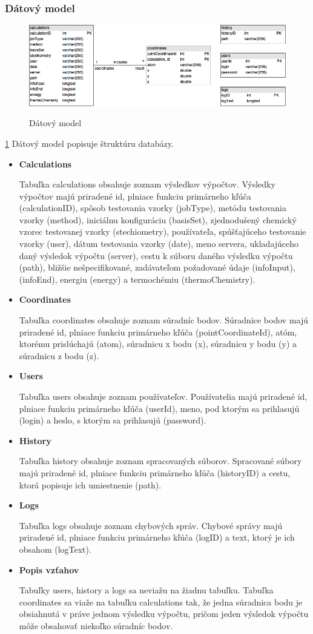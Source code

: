 \documentclass[12pt,a4paper]{article}
\begin{document}
\subsubsection{Dátový model}
\begin{figure}[H]
	\caption{Dátový model}
	\includegraphics[width=\textwidth]{datovy_model}
	\label{fig:datovy_model}
\end{figure}
\ref{fig:datovy_model}
Dátový model popisuje štruktúru databázy.
\begin{itemize}
	\item{\bf Calculations} \par
	Tabuľka calculations obsahuje zoznam výsledkov výpočtov. Výsledky výpočtov majú priradené id, plniace funkciu primárneho kľúča (calculationID), spôsob testovania vzorky (jobType), metódu testovania vzorky (method), iniciálnu konfiguráciu (basisSet), zjednodušený chemický vzorec testovanej vzorky (stechiometry), používateľa, spúšťajúceho testovanie vzorky (user), dátum testovania vzorky (date), meno servera, ukladajúceho daný výsledok výpočtu (server), cestu k súboru daného výsledku výpočtu (path), bližšie nešpecifikované, zadávateľom požadované údaje (infoInput), (infoEnd), energiu (energy) a termochémiu (thermoChemistry).
	\item{\bf Coordinates} \par
	Tabuľka coordinates obsahuje zoznam súradníc bodov. Súradnice bodov majú priradené id, plniace funkciu primárneho kľúča (pointCoordinateId), atóm, ktorému prislúchajú (atom), súradnicu x bodu (x), súradnicu y bodu (y) a súradnicu z bodu (z).
	\item{\bf Users} \par
	Tabuľka users obsahuje zoznam používateľov. Používatelia majú priradené id, plniace funkciu primárneho kľúča (userId), meno, pod ktorým sa prihlasujú (login) a heslo, s ktorým sa prihlasujú (password).
	\item{\bf History} \par
	Tabuľka history obsahuje zoznam spracovaných súborov. Spracované súbory majú priradené id, plniace funkciu primárneho kľúča (historyID) a cestu, ktorá popisuje ich umiestnenie (path).
	\item{\bf Logs} \par
	Tabuľka logs obsahuje zoznam chybových správ. Chybové správy majú priradené id, plniace funkciu primárneho kľúča (logID) a text, ktorý je ich obsahom (logText).
	\item{\bf Popis vzťahov} \par
	Tabuľky users, history a logs sa neviažu na žiadnu tabuľku. Tabuľka coordinates sa viaže na tabuľku calculations tak, že jedna súradnica bodu je obsiahnutá v práve jednom výsledku výpočtu, pričom jeden výsledok výpočtu môže obsahovať niekoľko súradníc bodov.
\end{itemize}
\end{document}
